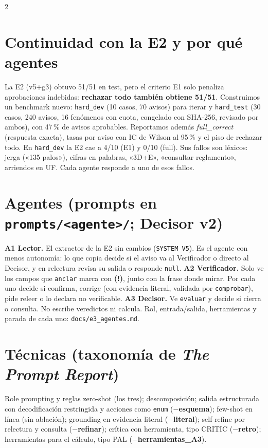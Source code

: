 \documentclass[9pt,a4paper]{extarticle}
\newcommand{\cod}[1]{\texttt{#1}}
\newcommand{\warn}{\textcolor{orange!80!black}{\textbf{(!)}}}
\begin{document}
\begin{multicols}{2}
\section{Continuidad con la E2 y por qué agentes}
La E2 (v5+g3) obtuvo 51/51 en test, pero el criterio E1 solo penaliza aprobaciones indebidas: \textbf{rechazar todo también obtiene 51/51}. Construimos un benchmark nuevo: \cod{hard\_dev} (10 casos, 70 avisos) para iterar y \cod{hard\_test} (30 casos, 240 avisos, 16 fenómenos con cuota, congelado con SHA-256, revisado por ambos), con 47\,\% de avisos aprobables. Reportamos además \textit{full\_correct} (respuesta exacta), tasas por aviso con IC de Wilson al 95\,\% y el piso de rechazar todo. En \cod{hard\_dev} la E2 cae a 4/10 (E1) y 0/10 (full). Sus fallos son léxicos: jerga («135 palos»), cifras en palabras, «3D+E», «consultar reglamento», arriendos en UF. Cada agente responde a uno de esos fallos.

\section{Agentes (prompts en \cod{prompts/<agente>/}; Decisor v2)}
\textbf{A1 Lector.} El extractor de la E2 sin cambios (\cod{SYSTEM\_V5}). Es el agente con menos autonomía: lo que copia decide si el aviso va al Verificador o directo al Decisor, y en relectura revisa su salida o responde \cod{null}. \textbf{A2 Verificador.} Solo ve los campos que \cod{anclar} marca con \warn{}, junto con la frase donde mirar. Por cada uno decide si confirma, corrige (con evidencia literal, validada por \cod{comprobar}), pide releer o lo declara no verificable. \textbf{A3 Decisor.} Ve \cod{evaluar} y decide si cierra o consulta. No escribe veredictos ni calcula. Rol, entrada/salida, herramientas y parada de cada uno: \cod{docs/e3\_agentes.md}.

\section{Técnicas (taxonomía de \textit{The Prompt Report})}
Role prompting y reglas zero-shot (los tres); descomposición; salida estructurada con decodificación restringida y acciones como \cod{enum} (\textbf{$-$esquema}); few-shot en línea (sin ablación); grounding en evidencia literal (\textbf{$-$literal}); self-refine por relectura y consulta (\textbf{$-$refinar}); crítica con herramienta, tipo CRITIC (\textbf{$-$retro}); herramientas para el cálculo, tipo PAL (\textbf{$-$herramientas\_A3}).


\end{multicols}
\end{document}
